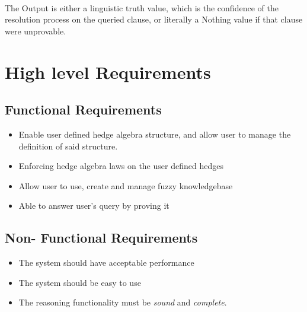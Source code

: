 \documentclass[../gr-final.tex]{subfiles}
\begin{document}
\paragraph{} The Output is either a linguistic truth value, which is
the confidence of the resolution process on the queried clause, or
literally a Nothing value if that clause were unprovable.

\section{High level Requirements}
\subsection{Functional Requirements}
\begin{itemize}
\item Enable user defined hedge algebra structure, and allow user to
  manage the definition of said structure.
\item Enforcing hedge algebra laws on the user defined hedges
\item Allow user to use, create and manage fuzzy knowledgebase
\item Able to answer user's query by proving it
\end{itemize}

\subsection{Non- Functional Requirements}
\begin{itemize}
\item The system should have acceptable performance
\item The system should be easy to use
\item The reasoning functionality must be {\em sound} and {\em complete}.
\end{itemize}



\end{document}
